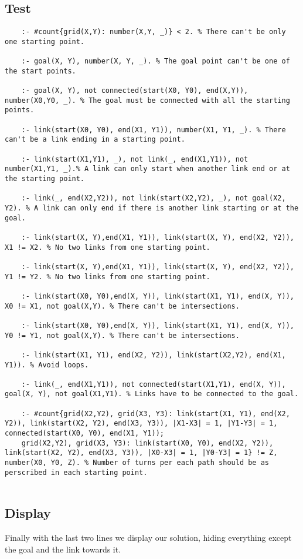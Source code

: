 \subsection{Test}
\begin{verbatim}
    :- #count{grid(X,Y): number(X,Y, _)} < 2. % There can't be only one starting point.

    :- goal(X, Y), number(X, Y, _). % The goal point can't be one of the start points.
    
    :- goal(X, Y), not connected(start(X0, Y0), end(X,Y)), number(X0,Y0, _). % The goal must be connected with all the starting points.
    
    :- link(start(X0, Y0), end(X1, Y1)), number(X1, Y1, _). % There can't be a link ending in a starting point.
    
    :- link(start(X1,Y1), _), not link(_, end(X1,Y1)), not number(X1,Y1, _).% A link can only start when another link end or at the starting point.
    
    :- link(_, end(X2,Y2)), not link(start(X2,Y2), _), not goal(X2, Y2). % A link can only end if there is another link starting or at the goal.
    
    :- link(start(X, Y),end(X1, Y1)), link(start(X, Y), end(X2, Y2)), X1 != X2. % No two links from one starting point.
    
    :- link(start(X, Y),end(X1, Y1)), link(start(X, Y), end(X2, Y2)), Y1 != Y2. % No two links from one starting point.
    
    :- link(start(X0, Y0),end(X, Y)), link(start(X1, Y1), end(X, Y)), X0 != X1, not goal(X,Y). % There can't be intersections.
    
    :- link(start(X0, Y0),end(X, Y)), link(start(X1, Y1), end(X, Y)), Y0 != Y1, not goal(X,Y). % There can't be intersections.
    
    :- link(start(X1, Y1), end(X2, Y2)), link(start(X2,Y2), end(X1, Y1)). % Avoid loops.
    
    :- link(_, end(X1,Y1)), not connected(start(X1,Y1), end(X, Y)), goal(X, Y), not goal(X1,Y1). % Links have to be connected to the goal.
    
    :- #count{grid(X2,Y2), grid(X3, Y3): link(start(X1, Y1), end(X2, Y2)), link(start(X2, Y2), end(X3, Y3)), |X1-X3| = 1, |Y1-Y3| = 1, connected(start(X0, Y0), end(X1, Y1));
    grid(X2,Y2), grid(X3, Y3): link(start(X0, Y0), end(X2, Y2)), link(start(X2, Y2), end(X3, Y3)), |X0-X3| = 1, |Y0-Y3| = 1} != Z, number(X0, Y0, Z). % Number of turns per each path should be as perscribed in each starting point.
    
\end{verbatim}

\subsection{Display}

Finally with the last two lines we display our solution, hiding everything except the goal and the link towards it.
